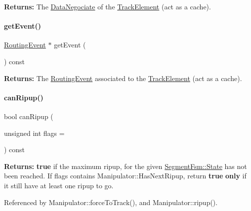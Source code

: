 {\bfseries Returns\+:} The \mbox{\hyperlink{classKite_1_1DataNegociate}{Data\+Negociate}} of the \mbox{\hyperlink{classKite_1_1TrackElement}{Track\+Element}} (act as a cache). \mbox{\label{classKite_1_1Manipulator_a513f39c546ef4be0d13787cdace4eadf}} 
\paragraph{\texorpdfstring{get\+Event()}{getEvent()}}
{\footnotesize\ttfamily \mbox{\hyperlink{classKite_1_1RoutingEvent}{Routing\+Event}} $\ast$ get\+Event (\begin{DoxyParamCaption}{ }\end{DoxyParamCaption}) const\hspace{0.3cm}{\ttfamily [inline]}}

{\bfseries Returns\+:} The \mbox{\hyperlink{classKite_1_1RoutingEvent}{Routing\+Event}} associated to the \mbox{\hyperlink{classKite_1_1TrackElement}{Track\+Element}} (act as a cache). \mbox{\label{classKite_1_1Manipulator_acae2506c976194aef762d27900c97b02}} 
\paragraph{\texorpdfstring{can\+Ripup()}{canRipup()}}
{\footnotesize\ttfamily bool can\+Ripup (\begin{DoxyParamCaption}\item[{unsigned int}]{flags = {} }\end{DoxyParamCaption}) const}

{\bfseries Returns\+:} {\bfseries true} if the maximum ripup, for the given \mbox{\hyperlink{classKite_1_1SegmentFsm_a5d74787dedbc4e11c1ab15bf487e61f8}{Segment\+Fsm\+::\+State}} has not been reached. If {\ttfamily flags} contains Manipulator\+::\+Has\+Next\+Ripup, return {\bfseries true} {\bfseries only} if it still have at least one ripup to go. 

Referenced by Manipulator\+::force\+To\+Track(), and Manipulator\+::ripup().

\mbox{\label{classKite_1_1Manipulator_a722e514efb92d4a05e4f4d9e1fe7f94b}} 
